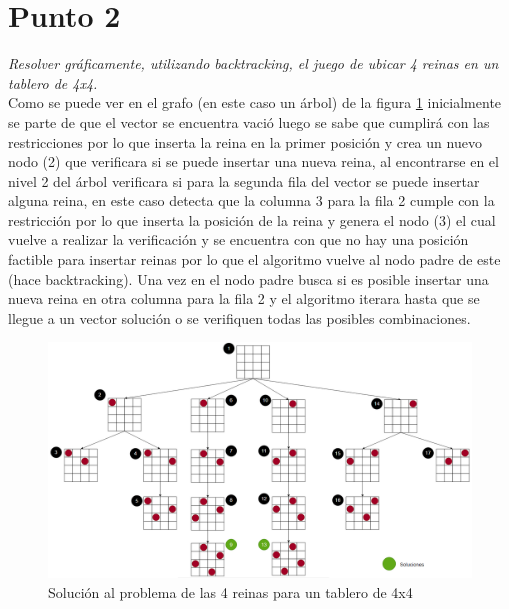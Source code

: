 \newpage
\section{Punto 2}

\textit{Resolver gráficamente, utilizando backtracking, el juego de ubicar 4 reinas en un tablero de 4x4.}\\


Como se puede ver en el grafo (en este caso un árbol) de la figura \ref{fig:4reinas} inicialmente se parte de que el vector se encuentra vació luego se sabe que cumplirá con las restricciones por lo que inserta la reina en la primer posición y crea un nuevo nodo (2) que verificara si se puede insertar una nueva reina, al encontrarse en el nivel 2 del árbol verificara si para la segunda fila del vector se puede insertar alguna reina, en este caso detecta que la columna 3 para la fila 2 cumple con la restricción por lo que inserta la posición de la reina y genera el nodo (3) el cual vuelve a realizar la verificación y se encuentra con que no hay una posición factible para insertar reinas por lo que el algoritmo vuelve al nodo padre de este (hace backtracking). Una vez en el nodo padre busca si es posible insertar una nueva reina en otra columna para la fila 2 y el algoritmo iterara hasta que se llegue a un vector solución o se verifiquen todas las posibles combinaciones.

\begin{figure}[!htb]
  \centering
  \includegraphics[width=\textwidth, scale=1]{Images/Punto2/4 reinas.png}
  \caption{Solución al problema de las 4 reinas para un tablero de 4x4}
  \label{fig:4reinas}
\end{figure}